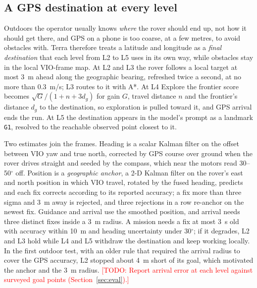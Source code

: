 \documentclass[conference]{IEEEtran}
\newcommand{\todo}[1]{\textcolor{red}{[TODO: #1]}}
\begin{document}
\subsection{A GPS destination at every level}
Outdoors the operator usually knows \emph{where} the rover should end up, not how it should get there, and GPS on a phone is too coarse, at a few metres, to avoid obstacles with.
Terra therefore treats a latitude and longitude as a \emph{final destination} that each level from L2 to L5 uses in its own way, while obstacles stay in the local VIO-frame map.
At L2 and L3 the rover follows a local target at most 3~m ahead along the geographic bearing, refreshed twice a second, at no more than 0.3~m/s; L3 routes to it with A*.
At L4 Explore the frontier score becomes $\sqrt{G}/(1 + n + 3 d_g)$ for gain $G$, travel distance $n$ and the frontier's distance $d_g$ to the destination, so exploration is pulled toward it, and GPS arrival ends the run.
At L5 the destination appears in the model's prompt as a landmark \texttt{G1}, resolved to the reachable observed point closest to it.

Two estimates join the frames.
Heading is a scalar Kalman filter on the offset between VIO yaw and true north, corrected by GPS course over ground when the rover drives straight and seeded by the compass, which near the motors read 30--50$^\circ$ off.
Position is a \emph{geographic anchor}, a 2-D Kalman filter on the rover's east and north position in which VIO travel, rotated by the fused heading, predicts and each fix corrects according to its reported accuracy; a fix more than three sigma and 3~m away is rejected, and three rejections in a row re-anchor on the newest fix.
Guidance and arrival use the smoothed position, and arrival needs three distinct fixes inside a 3~m radius.
A mission needs a fix at most 3~s old with accuracy within 10~m and heading uncertainty under 30$^\circ$; if it degrades, L2 and L3 hold while L4 and L5 withdraw the destination and keep working locally.
In the first outdoor test, with an older rule that required the arrival radius to cover the GPS accuracy, L2 stopped about 4~m short of its goal, which motivated the anchor and the 3~m radius.
\todo{Report arrival error at each level against surveyed goal points (Section~\ref{sec:eval}).}
\end{document}
